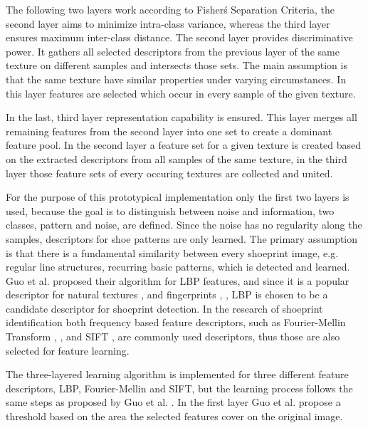 \documentclass[draft,final]{vutinfth} %
\begin{document}
\par
The following two layers work according to Fisher\'s Separation Criteria, the second layer aims to minimize intra-class variance, whereas the third layer ensures maximum inter-class distance. 
The second layer provides discriminative power.
It gathers all selected descriptors from the previous layer of the same texture on different samples and intersects those sets.
The main assumption is that the same texture have similar properties under varying circumstances.
In this layer features are selected which occur in every sample of the given texture.
\par
In the last, third layer representation capability is ensured.
This layer merges all remaining features from the second layer into one set to create a dominant feature pool.
In the second layer a feature set for a given texture is created based on the extracted descriptors from all samples of the same texture, in the third layer those feature sets of every occuring textures are collected and united.
\par
For the purpose of this prototypical implementation only the first two layers is used, because the goal is to distinguish between noise and information, two classes, pattern and noise, are defined.
Since the noise has no regularity along the samples, descriptors for shoe patterns are only learned.
The primary assumption is that there is a fundamental similarity between every shoeprint image, e.g. regular line structures, recurring basic patterns, which is detected and learned.
Guo et al. \cite{guo2012discriminative} proposed their algorithm for LBP features, and since it is a popular descriptor for natural textures \cite{hong2014combining}, \cite{ahonen2009rotation} and fingerprints \cite{wang2013pixel}, \cite{rida2018palmprint}, LBP is chosen to be a candidate descriptor for shoeprint detection.
In the research of shoeprint identification both frequency based feature descriptors, such as Fourier-Mellin Transform \cite{wu2019crime}, \cite{gueham2008automatic}, and SIFT \cite{nibouche2009rotation}, \cite{richetelli2017classification} are commonly used descriptors, thus those are also selected for feature learning.
\par
The three-layered learning algorithm is implemented for three different feature descriptors, LBP, Fourier-Mellin and SIFT, but the learning process follows the same steps as proposed by Guo et al. \cite{guo2012discriminative}.
In the first layer Guo et al. \cite{guo2012discriminative} propose a threshold based on the area the selected features cover on the original image.
\end{document}
